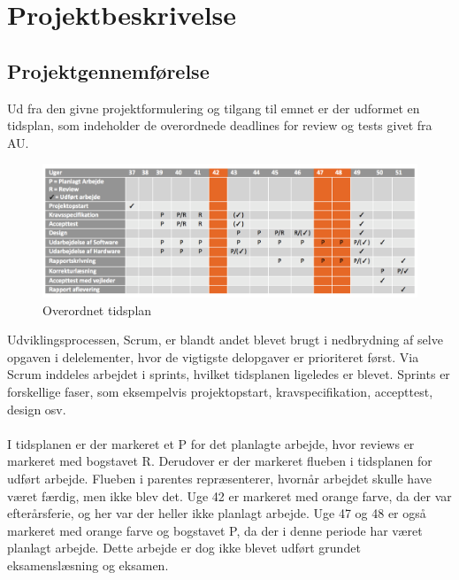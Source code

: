 \chapter{Projektbeskrivelse}

\section{Projektgennemførelse}
Ud fra den givne projektformulering og tilgang til emnet er der udformet en tidsplan, som indeholder de overordnede deadlines for review og tests givet fra AU.
\begin{figure}[H]
	\centering
	\includegraphics[width=1\textwidth]{Figurer/Snip20151210_74.png}
	\caption{Overordnet tidsplan}
\end{figure}
Udviklingsprocessen, Scrum, er blandt andet blevet brugt i nedbrydning af selve opgaven i delelementer, hvor de vigtigste delopgaver er prioriteret først. Via Scrum inddeles arbejdet i sprints, hvilket tidsplanen ligeledes er blevet. Sprints er forskellige faser, som eksempelvis projektopstart, kravspecifikation, accepttest, design osv.\\\\
I tidsplanen er der markeret et P for det planlagte arbejde, hvor reviews er markeret med bogstavet R. Derudover er der markeret flueben i tidsplanen for udført arbejde. Flueben i parentes repræsenterer, hvornår arbejdet skulle have været færdig, men ikke blev det. Uge 42 er markeret med orange farve, da der var efterårsferie, og her var der heller ikke planlagt arbejde. Uge 47 og 48 er også markeret med orange farve og bogstavet P, da der i denne periode har været planlagt arbejde. Dette arbejde er dog ikke blevet udført grundet eksamenslæsning og eksamen.

